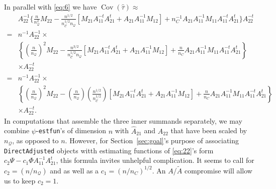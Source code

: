 \documentclass{article}
\begin{document}
  In parallel with \eqref{eq:6} we
  have $\operatorname{Cov}(\hat\tau) \approx$
  \begin{align*}
  &A_{22}^{-1}\{\frac{n}{n_{\mathcal{Q}}^{2}} M_{22} -
                                 \frac{n^{1/2}}{n_{\mathcal{C}}^{1/2}n_{\mathcal{Q}}}[M_{21}A_{11}^{-t}A_{21}^t
                                 + A_{21}A_{11}^{-1}M_{12}] +
                                 n_C^{-1}A_{21}A_{11}^{-1}M_{11}A_{11}^{-t}A_{21}^{t}\}A_{22}^{-t}\nonumber
  \\
                               =& n^{-1}A_{22}^{-1} \times\\
                                 &\left\{\left(\frac{n}{n_{\mathcal{Q}}}\right)^{2}M_{22} -
                                 \frac{n^{3/2}}{n_{\mathcal{C}}^{1/2}n_{\mathcal{Q}}}[M_{21}A_{11}^{-t}A_{21}^t
                                 + A_{21}A_{11}^{-1}M_{12}] +
                                 \frac{n}{n_C}A_{21}A_{11}^{-1}M_{11}A_{11}^{-t}A_{21}^{t}\right\}\\
    &
                                 \times A_{22}^{-t}\\
                               =& n^{-1}A_{22}^{-1} \times\\
                                 &\left\{\left(\frac{n}{n_{\mathcal{Q}}}\right)^{2}M_{22} -
                                 \left(\frac{n}{n_{\mathcal{Q}}}\right)\left(\frac{n^{1/2}}{n_{\mathcal{C}}^{1/2}}\right)[M_{21}A_{11}^{-t}A_{21}^t
                                 + A_{21}A_{11}^{-1}M_{12}] +
                                 \frac{n}{n_C}A_{21}A_{11}^{-1}M_{11}A_{11}^{-t}A_{21}^{t}\right\}\\
    &
                                 \times A_{22}^{-t}
                                . 
\end{align*}
In computations that assemble the three inner summands separately, we may combine $\psi$-\texttt{estfun}'s of dimension
$n$ with $\hat{A}_{21}$ and $\hat{A}_{22}$ that have been scaled by
$n_{\mathcal{Q}}$, as opposed to $n$.  However, for Section~\ref{sec:goal}'s purpose of
associating \texttt{DirectAdjusted} objects witth estimating functions of \eqref{eq:22}'s form $c_{2}\Psi - c_{1}\Phi
A_{11}^{-1}A_{21}^{t}$, this formula invites unhelpful
complication. It seems to call for $c_{2}=({n}/{n_{\mathcal{Q}}})$
and as well as a $c_{1}=({n}/{n_C})^{1/2}$.  An $A$/$\tilde{A}$
compromise will allow us to keep $c_{2}=1$. 
\end{document}
